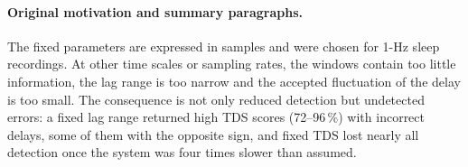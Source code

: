 \documentclass[11pt,a4paper]{article}
\begin{document}
\paragraph{Original motivation and summary paragraphs.} The fixed parameters are expressed in samples and were chosen for 1-Hz sleep recordings. At other time scales or sampling rates, the windows contain too little information, the lag range is too narrow and the accepted fluctuation of the delay is too small. The consequence is not only reduced detection but undetected errors: a fixed lag range returned high TDS scores (72--96\,\%) with incorrect delays, some of them with the opposite sign, and fixed TDS lost nearly all detection once the system was four times slower than assumed.
\end{document}
